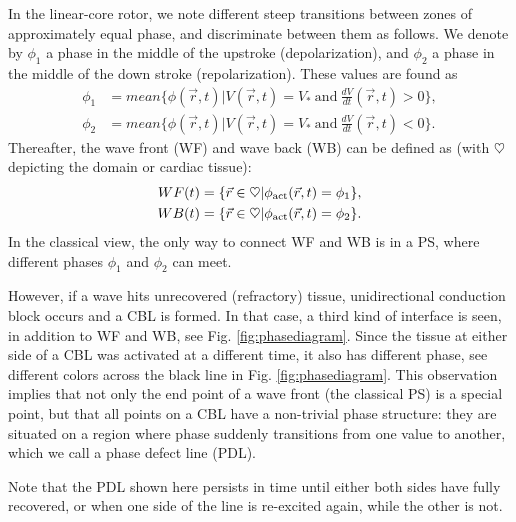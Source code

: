 \documentclass[aps,pre,amsfonts,amssymb,amsmath,twocolumn, superscriptaddress]{revtex4-1}
\newcommand{\phiact}{\ensuremath{\phi_{\rm act}}}
\newcommand{\VS}{V_*}
\begin{document}
In the linear-core rotor, we note different steep transitions between zones of approximately equal phase, and discriminate between them as follows. 
We denote by $\phi_1$ a phase in the middle of the upstroke (depolarization), and $\phi_2$ a phase in the middle of the down stroke (repolarization). 
These values are found as
\begin{align}
    \phi_1 &= mean \{ \phi(\vec{r},t) | V(\vec{r},t) = \VS \ \mathrm{and}\ \frac{dV}{dt}(\vec{r},t) >0\}, \nonumber \\
    \phi_2 &= mean \{ \phi(\vec{r},t) | V(\vec{r},t) = \VS \ \mathrm{and}\ \frac{dV}{dt}(\vec{r},t) < 0\}. \label{defphi12}
\end{align}
Thereafter, the wave front (WF) and wave back (WB) can be defined as (with $\heartsuit$ depicting the domain or cardiac tissue): 
\begin{align}
     WF (t)  = \{\vec{r} \in \heartsuit | \phiact(\vec{r},t) = \phi_1 \}, \label{WF} \\
     WB (t)  = \{\vec{r} \in \heartsuit | \phiact(\vec{r},t) = \phi_2 \}. \nonumber
\end{align}
In the classical view, the only way to connect WF and WB is in a PS, where different phases $\phi_1$ and $\phi_2$ can meet. 

 However, if a wave hits unrecovered (refractory) tissue, unidirectional conduction block occurs and a CBL is formed. In that case, a third kind of interface is seen, in addition to WF and WB, see Fig. \ref{fig:phasediagram}. Since the tissue at either side of a CBL was activated at a different time, it also has different phase, see different colors across the black line in Fig. \ref{fig:phasediagram}. This observation implies that not only the end point of a wave front (the classical PS) is a special point, but that all points on a CBL have a non-trivial phase structure: they are situated on a region where phase suddenly transitions from one value to another, which we call a phase defect line (PDL). 
 
 Note that the PDL shown here persists in time until either both sides have fully recovered, or when one side of the line is re-excited again, while the other is not. 
\end{document}
